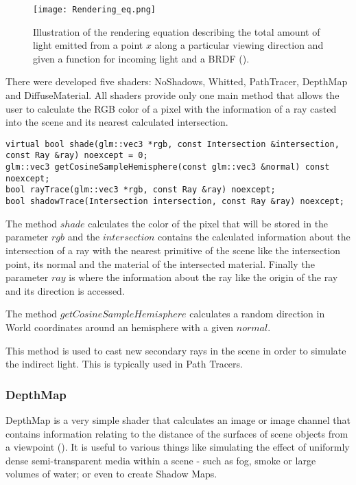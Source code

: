 \begin{figure}[H]
	\centering
	\caption{Illustration of the rendering equation describing the total amount of light emitted from a point
	$x$
	along a particular viewing direction and given a function for incoming light and a BRDF (\cite{RenderingEquation}).}
	\label{Rendering_Equation.}
	\texttt{[image: Rendering\_eq.png]}
\end{figure}

\par
There were developed five shaders: NoShadows, Whitted, PathTracer, DepthMap and DiffuseMaterial.
All shaders provide only one main method that allows the user to calculate the RGB color of a pixel with the information of a ray casted into the scene and its nearest calculated intersection.

\begin{lstlisting}[caption={Main methods of Shader}, captionpos=b, label=Shader]
virtual bool shade(glm::vec3 *rgb, const Intersection &intersection, const Ray &ray) noexcept = 0;
glm::vec3 getCosineSampleHemisphere(const glm::vec3 &normal) const noexcept;
bool rayTrace(glm::vec3 *rgb, const Ray &ray) noexcept;
bool shadowTrace(Intersection intersection, const Ray &ray) noexcept;
\end{lstlisting}

\par
The method
$shade$
calculates the color of the pixel that will be stored in the parameter
$rgb$
and the
$intersection$
contains the calculated information about the intersection of a ray with the nearest primitive of the scene like the intersection point, its normal and the material of the intersected material.
Finally the parameter
$ray$
is where the information about the ray like the origin of the ray and its direction is accessed.

\par
The method
$getCosineSampleHemisphere$
calculates a random direction in World coordinates around an hemisphere with a given
$normal$.

This method is used to cast new secondary rays in the scene in order to simulate the indirect light.
This is typically used in Path Tracers.

\subsubsection{DepthMap}

\par
DepthMap is a very simple shader that calculates an image or image channel that contains information relating to the distance of the surfaces of scene objects from a viewpoint (\cite{DepthMap}).
It is useful to various things like simulating the effect of uniformly dense semi-transparent media within a scene - such as fog, smoke or large volumes of water; or even to create Shadow Maps.


